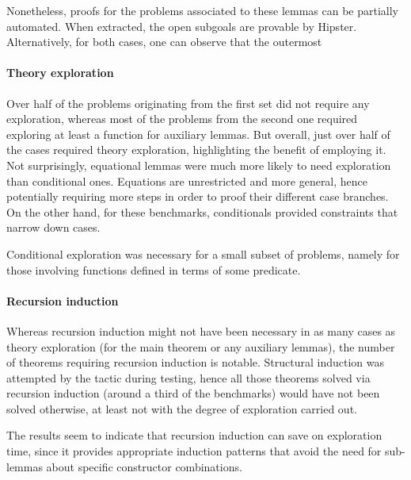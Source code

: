 Nonetheless, proofs for the problems associated to these lemmas can be partially automated.
%
When extracted, the open subgoals are provable by Hipster.
%
Alternatively, for both cases, one can observe that the outermost 



\paragraph{Theory exploration}

Over half of the problems originating from the first set did not require any exploration, whereas most of the problems from the second one required exploring at least a function for auxiliary lemmas. But overall, just over half of the cases required theory exploration, highlighting the benefit of employing it. Not surprisingly, equational lemmas were much more likely to need exploration than conditional ones. Equations are unrestricted and more general, hence potentially requiring more steps in order to proof their different case branches. On the other hand, for these benchmarks, conditionals provided constraints that narrow down cases.

Conditional exploration was necessary for a small subset of problems, namely for those involving functions defined in terms of some predicate.

\paragraph{Recursion induction}

Whereas recursion induction might not have been necessary in as many cases as theory exploration (for the main theorem or any auxiliary lemmas), the number of theorems requiring recursion induction is notable. Structural induction was attempted by the tactic during testing, hence all those theorems solved via recursion induction (around a third of the benchmarks) would have not been solved otherwise, at least not with the degree of exploration carried out.

The results seem to indicate that recursion induction can save on exploration time, since it provides appropriate induction patterns that avoid the need for sub-lemmas about specific constructor combinations.



